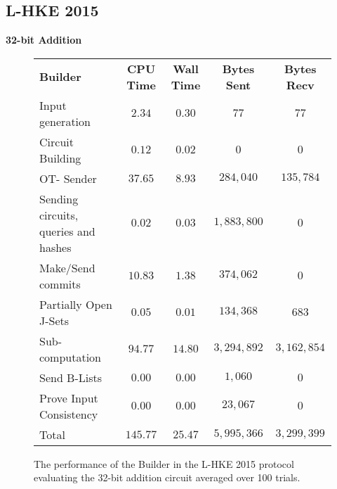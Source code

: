 \documentclass[ %
                    author={Nicholas Tutte},
                supervisor={Prof. Nigel Smart},
                    degree={MEng},
                     title={Secure Two Party Computation},
                  subtitle={A practical comparison of recent protocols},
                      type={Research - GG1K},
                      year={2015} ]{dissertation}
\begin{document}
			\subsection{L-HKE 2015} \label{sub:L-HKE_Results_Analysis}
				\FloatBarrier
				\noindent \textbf{32-bit Addition}
				\begin{figure}[!ht]
					\begin{tabular}{| p{4.3cm} | c c c c |}
						\hline
						\textbf{Builder} & \textbf{CPU Time} & \textbf{Wall Time} & \textbf{Bytes Sent} & \textbf{Bytes Recv} \\
						\thickhline
						Input generation & $2.34$ & $0.30$ & $77$ & $77$ \\
						\hline
						Circuit Building & $0.12$ & $0.02$ & $0$ & $0$ \\
						\hline
						OT- Sender & $37.65$ & $8.93$ & $284,040$ & $135,784$ \\
						\hline
						Sending circuits, queries and hashes & $0.02$ & $0.03$ & $1,883,800$ & $0$ \\
						\hline
						Make/Send commits & $10.83$ & $1.38$ & $374,062$ & $0$ \\
						\hline
						Partially Open J-Sets & $0.05$ & $0.01$ & $134,368$ & $683$ \\
						\hline
						Sub-computation & $94.77$ & $14.80$ & $3,294,892$ & $3,162,854$ \\
						\hline
						Send B-Lists & $0.00$ & $0.00$ & $1,060$ & $0$ \\
						\hline
						Prove Input Consistency & $0.00$ & $0.00$ & $23,067$ & $0$ \\
						\thickhline
						Total & $145.77$ & $25.47$ & $5,995,366$ & $3,299,399$ \\
						\hline
					\end{tabular}
					\caption{The performance of the Builder in the L-HKE 2015 protocol evaluating the 32-bit addition circuit averaged over 100 trials. \label{table:L-HKE_2015_Add_Builder}}
				\end{figure}
\end{document}
